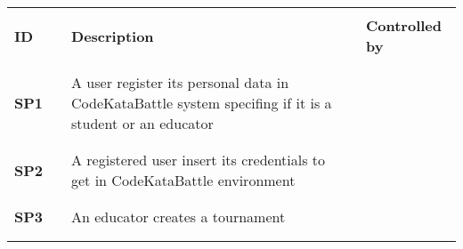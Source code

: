  \renewcommand{\arraystretch}{0.5}
 \begin{longtable}[H]{l l p{8.5cm} l l}
     \hline
                               &        &                                                                                                                                       &        &                        \\
     \textbf{ID}               & \vline & \textbf{Description}                                                                                                                  & \vline & \textbf{Controlled by} \\
                               &        &                                                                                                                                       &        &                        \\\hline & & & & \\
     \textbf{SP1}              & \vline & A user register its personal data in CodeKataBattle system specifing if it is a student or an educator                                & \vline &                        \\
                               &        &                                                                                                                                       &        &                        \\\hline & & & & \\
     \textbf{SP2}              & \vline & A registered user insert its credentials to get in CodeKataBattle environment                                                         & \vline &                        \\
                               &        &                                                                                                                                       &        &                        \\\hline & & & & \\
     \textbf{SP3}              & \vline & An educator creates a tournament                                                                                                      & \vline &                        \\
                               &        &                                                                                                                                       &        &                        \\\hline & & & & \\

\end{longtable}
